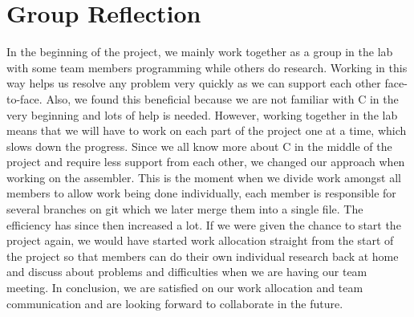 \documentclass[11pt]{article}
\begin{document}
\section{Group Reflection}
In the beginning of the project, we mainly work together as a group in the lab with some team members programming while others do research. Working in this way helps us resolve any problem very quickly as we can support each other face-to-face. Also, we found this beneficial because we are not familiar with C in the very beginning and lots of help is needed. However, working together in the lab means that we will have to work on each part of the project one at a time, which slows down the progress. Since we all know more about C in the middle of the project and require less support from each other, we changed our approach when working on the assembler. This is the moment when we divide work amongst all members to allow work being done individually, each member is responsible for several branches on git which we later merge them into a single file. The efficiency has since then increased a lot. If we were given the chance to start the project again, we would have started work allocation straight from the start of the project so that members can do their own individual research back at home and discuss about problems and difficulties when we are having our team meeting. In conclusion, we are satisfied on our work allocation and team communication and are looking forward to collaborate in the future.
\end{document}
